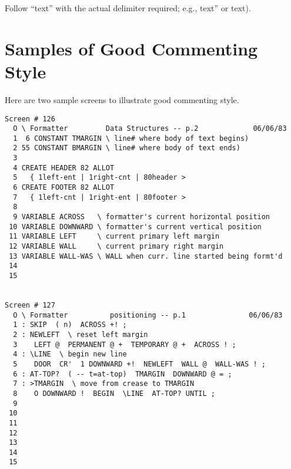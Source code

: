Follow ``text'' with the actual delimiter required; e.g., text'' or text).

\section{Samples of Good Commenting Style}

Here are two sample screens to illustrate good commenting style.

\begin{verbatim}
Screen # 126
  O \ Formatter         Data Structures -- p.2             06/06/83
  1  6 CONSTANT TMARGIN \ line# where body of text begins)
  2 55 CONSTANT BMARGIN \ line# where body of text ends)
  3
  4 CREATE HEADER 82 ALLOT
  5   { 1left-ent | 1right-cnt | 80header >
  6 CREATE FOOTER 82 ALLOT
  7   { 1left-cnt | 1right-ent | 80footer >
  8
  9 VARIABLE ACROSS   \ formatter's current horizontal position
 10 VARIABLE DOWNWARD \ formatter's current vertical position
 11 VARIABLE LEFT     \ current primary left margin
 12 VARIABLE WALL     \ current primary right margin
 13 VARIABLE WALL-WAS \ WALL when curr. line started being formt'd
 14
 15


Screen # 127
  O \ Formatter          positioning -- p.1               06/06/83
  1 : SKIP  ( n)  ACROSS +! ;
  2 : NEWLEFT  \ reset left margin
  3    LEFT @  PERMANENT @ +  TEMPORARY @ +  ACROSS ! ;
  4 : \LINE  \ begin new line
  5    DOOR  CR'  1 DOWNWARD +!  NEWLEFT  WALL @  WALL-WAS ! ;
  6 : AT-TOP?  ( -- t=at-top)  TMARGIN  DOWNWARD @ = ;
  7 : >TMARGIN  \ move from crease to TMARGIN
  8    O DOWNWARD !  BEGIN  \LINE  AT-TOP? UNTIL ;
  9
 10
 11
 12
 13
 14
 15
\end{verbatim}

